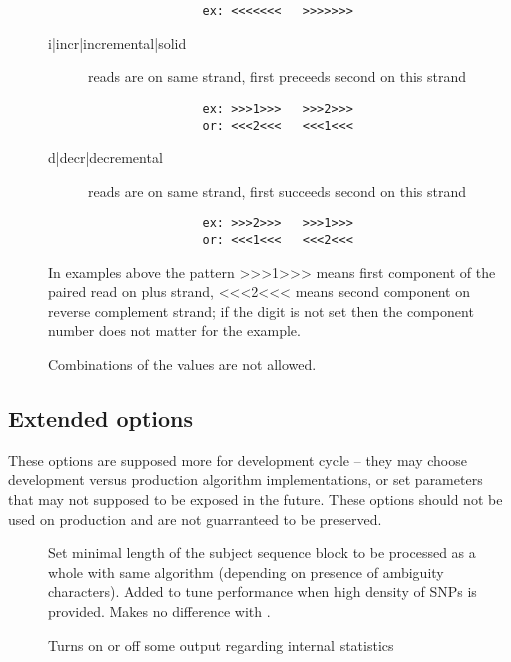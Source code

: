 \documentclass[english]{article}
\begin{document}
\begin{description}
\begin{description}
	\begin{verbatim}
                ex: <<<<<<<   >>>>>>>
	\end{verbatim}
	\item[i|incr|incremental|solid]
				reads are on same strand, first preceeds second on this strand
	\begin{verbatim}
                ex: >>>1>>>   >>>2>>>
                or: <<<2<<<   <<<1<<<
	\end{verbatim}
	\item[d|decr|decremental]
				reads are on same strand, first succeeds second on this strand
	\begin{verbatim}
                ex: >>>2>>>   >>>1>>>
                or: <<<1<<<   <<<2<<<
	\end{verbatim}
	\end{description}

                In examples above the pattern >>>1>>> means first component of 
                the paired read on plus strand, <<<2<<< means second component 
                on reverse complement strand; if the digit is not set then the
                component number does not matter for the example.

                Combinations of the values are not allowed.
\end{description}

\subsection{Extended options}
    These options are supposed more for development cycle -- they may choose 
    development versus production algorithm implementations, or set parameters 
    that may not supposed to be exposed in the future. These options should 
    not be used on production and are not guarranteed to be preserved.
\begin{description}
\item[]
                Set minimal length of the subject sequence block to be 
                processed as a whole with same algorithm (depending on 
                presence of ambiguity characters).  Added to tune 
                performance when high density of SNPs is provided. Makes
                no difference with .
\item[]
	Turns on or off some output regarding internal  statistics
\end{description}
\end{document}
